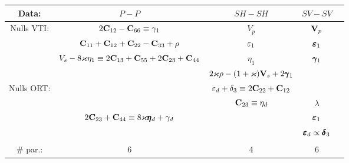 \begin{table} \label{tab:tradeoffs}
	\begin{tabular}{|c|c | c | c | c}
		\hline
		    Data:     &                                 $P-P$                                  & $SH-SH$                                          & $SV-SV$                                      &  \\ \hline
		 Nulls VTI:   &                   $2\mathbf{C}_{12}-\mathbf{C}_{66}\equiv\gamma_1$                   & $V_p$                                            & ${\mathbf{V}}_p$                                      &  \\
		              &               $\mathbf{C}_{11}+\mathbf{C}_{12}+\mathbf{C}_{22}-\mathbf{C}_{33}+\rho$               & $\varepsilon_1$                                         & $\pmb{\varepsilon}_1$                                      &  \\
		              & $V_s - 8\varkappa \eta_1 \equiv 2\mathbf{C}_{13}+\mathbf{C}_{55}+2\mathbf{C}_{23}+\mathbf{C}_{44}$ & $\eta_1$                                         & $\pmb{\gamma}_1$                                      &  \\ 
		              &                                                                        & $2\varkappa \rho - (1+\varkappa) {\mathbf{V}}_s + 2\pmb{\gamma}_1$ &                                    &  \\ \hline
		 Nulls ORT:   &                                                                        & $\varepsilon_d + \delta_3 \equiv 2\mathbf{C}_{22}+\mathbf{C}_{12}$    &                                    &  \\
		              &                                                                        & $\mathbf{C}_{23}\equiv \eta_d$                  & $ \lambda$                                   &  \\
		              &        $2\mathbf{C}_{23}+\mathbf{C}_{44} \equiv 8\varkappa \pmb{\eta}_d+ \gamma_d$         &                               & $\pmb{\varepsilon}_1$                                     &  \\
		              &                                                                        &                             & $\pmb{\varepsilon}_d \propto \pmb{\delta}_3$                    &  \\
		              &                                                                        &                                                  &                                              &  \\ \hline
		  \# par.:    &                                   6                                    & 4                                                & 6                                            &  \\

\end{tabular}
\end{table}

